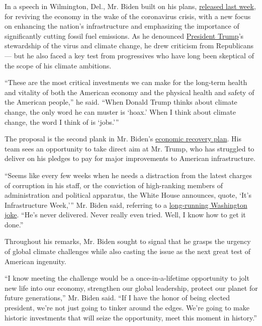In a speech in Wilmington, Del., Mr. Biden built on his plans,
\href{https://www.nytimes.com/2020/07/09/us/politics/biden-buy-american.html}{released
last week}, for reviving the economy in the wake of the coronavirus
crisis, with a new focus on enhancing the nation's infrastructure and
emphasizing the importance of significantly cutting fossil fuel
emissions. As he denounced
\href{https://www.nytimes.com/interactive/2020/us/elections/donald-trump.html}{President
Trump}'s stewardship of the virus and climate change, he drew criticism
from Republicans --- but he also faced a key test from progressives who
have long been skeptical of the scope of his climate ambitions.

``These are the most critical investments we can make for the long-term
health and vitality of both the American economy and the physical health
and safety of the American people,'' he said. ``When Donald Trump thinks
about climate change, the only word he can muster is `hoax.' When I
think about climate change, the word I think of is `jobs.'''

The proposal is the second plank in Mr. Biden's
\href{https://www.nytimes.com/2020/07/09/us/politics/biden-buy-american.html}{economic
recovery plan}. His team sees an opportunity to take direct aim at Mr.
Trump, who has struggled to deliver on his pledges to pay for major
improvements to American infrastructure.

``Seems like every few weeks when he needs a distraction from the latest
charges of corruption in his staff, or the conviction of high-ranking
members of administration and political apparatus, the White House
announces, quote, `It's Infrastructure Week,''' Mr. Biden said,
referring to a
\href{https://www.nytimes.com/2019/05/22/us/politics/trump-infrastructure-week.html}{long-running
Washington joke}. ``He's never delivered. Never really even tried. Well,
I know how to get it done.''

Throughout his remarks, Mr. Biden sought to signal that he grasps the
urgency of global climate challenges while also casting the issue as the
next great test of American ingenuity.

``I know meeting the challenge would be a once-in-a-lifetime opportunity
to jolt new life into our economy, strengthen our global leadership,
protect our planet for future generations,'' Mr. Biden said. ``If I have
the honor of being elected president, we're not just going to tinker
around the edges. We're going to make historic investments that will
seize the opportunity, meet this moment in history.''

